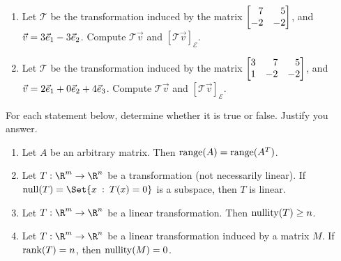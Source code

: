 \begin{exercises}
\begin{problist}
		\prob 
		\begin{enumerate}
			\item Let $\mathcal T$ be the transformation induced by the
				matrix $\mat{7&5\\-2&-2}$, and
				$\vec v=3{\vec e_1}-3{\vec e_2}$.
				Compute $\mathcal T\vec v$ and $[\mathcal T\vec v]_{\mathcal E}$.

			\item Let $\mathcal T$ be the transformation induced by the
				matrix $\mat{3&7&5\\1&-2&-2}$, and
				$\vec v=2{\vec e_1}+0{\vec e_2}+4{\vec e_3}$.
				Compute $\mathcal T\vec v$ and $[\mathcal T\vec v]_{\mathcal E}$.
		\end{enumerate}

		\prob For each statement below, determine whether it is true or false. Justify you answer.
		\begin{enumerate}
			\item Let $A$ be an arbitrary matrix. Then $\operatorname{range}(A)=\operatorname{range}(A^{T})$.

			\item Let $T:\R^{m}\to\R^{n}$ be a transformation (not necessarily
				linear). If $\Null(T)=\Set{x \given T(x)=0}$
				is a subspace, then $T$ is linear.

			\item Let $T:\R^{m}\to\R^{n}$ be a linear transformation.
				Then $\operatorname{nullity}(T) \geq n$.

			\item Let $T:\R^{m}\to\R^{n}$ be a linear transformation
				induced by a matrix $M$. If
				$\operatorname{rank}(T) = n$, then $\operatorname{nullity}(M) = 0$.
		\end{enumerate}
	\end{problist}
\end{exercises}
